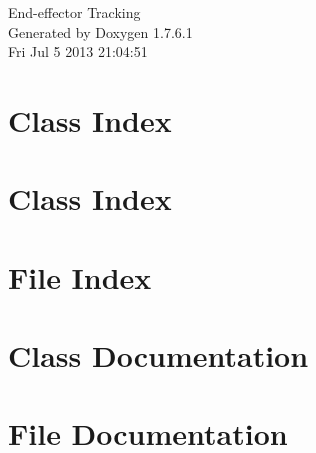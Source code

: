 \documentclass[a4paper]{book}
\begin{document}
\hypersetup{pageanchor=false,citecolor=blue}
\begin{titlepage}
\vspace*{7cm}
\begin{center}
{\Large \-End-\/effector \-Tracking }\\
\vspace*{1cm}
{\large \-Generated by Doxygen 1.7.6.1}\\
\vspace*{0.5cm}
{\small Fri Jul 5 2013 21:04:51}\\
\end{center}
\end{titlepage}
\clearemptydoublepage
{}
\tableofcontents
\clearemptydoublepage
{}
\hypersetup{pageanchor=true,citecolor=blue}
\chapter{\-Class \-Index}

\chapter{\-Class \-Index}

\chapter{\-File \-Index}

\chapter{\-Class \-Documentation}











\chapter{\-File \-Documentation}














\printindex
\end{document}
